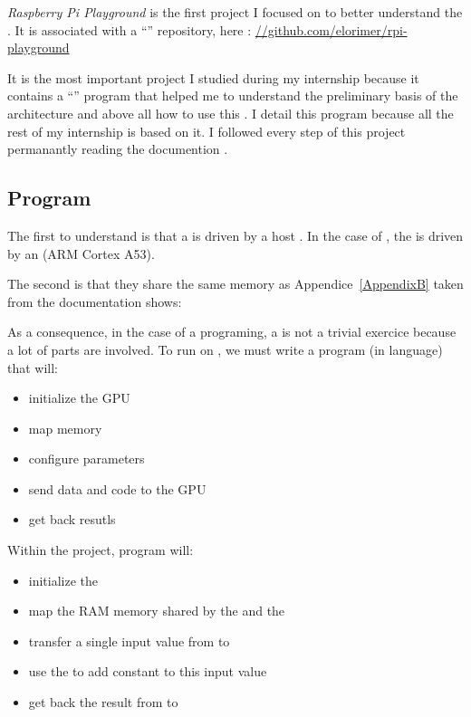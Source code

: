 \emph{Raspberry Pi Playground} \parencite{refRpiPlayground} is the first project I focused on to better understand the \vc. It is associated with a \enquote{} repository, here : \url{//github.com/elorimer/rpi-playground}

It is the most important project I studied during my internship because it contains a \enquote{} program that helped me to understand the preliminary basis of the \vc{} architecture and above all how to use this . I detail this program because all the rest of my internship is based on it. I followed every step of this project permanantly reading the \vc{} documention \parencite{refVC}.


\subsection{ Program}

The first  to understand is that a  is driven by a host . In the case of \bcm, the \vc{} is driven by an \cpu{}(ARM Cortex A53).

The second  is that they share the same  memory as Appendice~\ref{AppendixB} taken from the \bcm{} documentation \parencite{refBCM} shows:


As a consequence, in the case of a  programing, a  is not a trivial exercice because a lot of parts are involved. To run  on \vc, we must write a \cpu{} program (in  language) that will:
\begin{itemize}
	\item initialize the GPU
	\item map memory
	\item configure parameters
	\item send data and code to the GPU
	\item get back resutls
\end{itemize}
\vspace{10 mm}

Within the  project,  program will:

\begin{itemize}
	\item initialize the \vc
	\item map the RAM memory shared by the \vc{} and the \cpu
	\item transfer a single input value from \cpu{} to \vc
	\item use the \vc{} to add constant to this input value
	\item get back the result from \vc{} to \cpu
\end{itemize}



